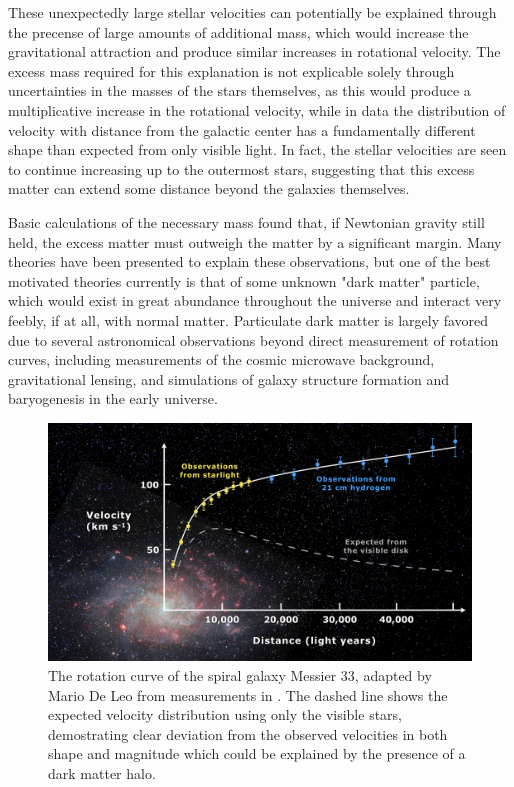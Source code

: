 These unexpectedly large stellar velocities can potentially be explained through the precense of large amounts of additional mass, which would increase the gravitational attraction and produce similar increases in rotational velocity. 
The excess mass required for this explanation is not explicable solely through uncertainties in the masses of the stars themselves, as this would produce a multiplicative increase in the rotational velocity, while in data the distribution of velocity with distance from the galactic center has a fundamentally different shape than expected from only visible light.
In fact, the stellar velocities are seen to continue increasing up to the outermost stars, suggesting that this excess matter can extend some distance beyond the galaxies themselves. 

Basic calculations of the necessary mass found that, if Newtonian gravity still held, the excess matter must outweigh the matter by a significant margin. 
Many theories have been presented to explain these observations, but one of the best motivated theories currently is that of some unknown "dark matter" particle, which would exist in great abundance throughout the universe and interact very feebly, if at all, with normal matter.
Particulate dark matter is largely favored due to several astronomical observations beyond direct measurement of rotation curves, including measurements of the cosmic microwave background, gravitational lensing, and simulations of galaxy structure formation and baryogenesis in the early universe.

\begin{figure}
   \label{fig:rotCurve}
   \centering
   \includegraphics[width=\textwidth]{figures/rotation_curve.png}
   \caption[Rotation curve of Messier 33]{The rotation curve of the spiral galaxy Messier 33, adapted by Mario De Leo from measurements in \cite{Corbelli}. The dashed line shows the expected velocity distribution using only the visible stars, demostrating clear deviation from the observed velocities in both shape and magnitude which could be explained by the presence of a dark matter halo.}
\end{figure}


